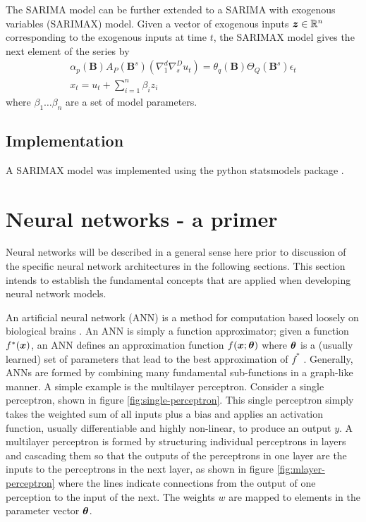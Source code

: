 The SARIMA model can be further extended to a SARIMA with exogenous variables (SARIMAX) model.
Given a vector of exogenous inputs ${\bm{z}} \in \mathbb{R}^{n}$ corresponding to the exogenous inputs at time $t$, the SARIMAX model gives the next element of the series by
\begin{gather}	
\alpha_{p}(\textbf{B})A_{P}(\textbf{B}^{s})(\nabla_{1}^{d}\nabla_{s}^{D}u_{t}) = \theta_{q}(\textbf{B})\Theta_{Q}(\textbf{B}^{s})\epsilon_{t} \\	
x_{t} = u_{t} + \sum_{i=1}^{n}\beta_{i}z_{i}
\end{gather}
where $\beta_{1} \ldots \beta_{n}$ are a set of model parameters.

\subsection{Implementation}
A SARIMAX model was implemented using the python statsmodels package \cite{statsmodels}.


\section{Neural networks - a primer}
Neural networks will be described in a general sense here prior to discussion of the specific neural network architectures in the following sections.
This section intends to establish the fundamental concepts that are applied when developing neural network models.

An artificial neural network (ANN) is a method for computation based loosely on biological brains \citep{negnevitsky2005artificial}.
An ANN is simply a function approximator; given a function $f^*({\bm{x}})$, an ANN defines an approximation function $f({\bm{x}}; {\bm{\theta}})$ where ${\bm{\theta}}$ is a (usually learned) set of parameters that lead to the best approximation of $f^*$ \citep{Goodfellow-et-al-2016}. 
Generally, ANNs are formed by combining many fundamental sub-functions in a graph-like manner. 
A simple example is the multilayer perceptron.
Consider a single perceptron, shown in figure \ref{fig:single-perceptron}.
This single perceptron simply takes the weighted sum of all inputs plus a bias and applies an activation function, usually differentiable and highly non-linear, to produce an output $y$.
A multilayer perceptron is formed by structuring individual perceptrons in layers and cascading them so that the outputs of the perceptrons in one layer are the inputs to the perceptrons in the next layer, as shown in figure \ref{fig:mlayer-perceptron} where the lines indicate connections from the output of one perception to the input of the next.
The weights $w$ are mapped to elements in the parameter vector ${\bm{\theta}}$.

